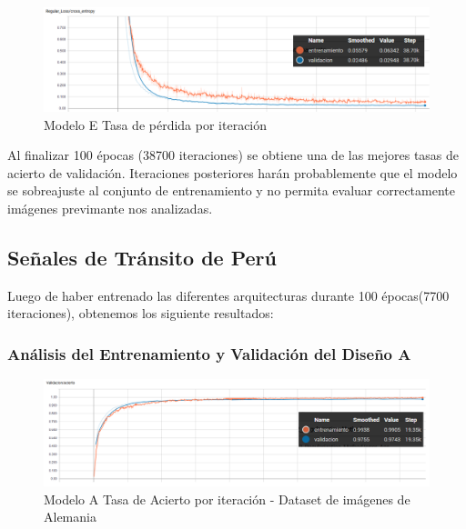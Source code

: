 			\begin{figure}[H]
				\begin{center}
				\includegraphics[width=1\textwidth]{images/desarrollo/trainResults/model7Loss} 
				\end{center}
				\begin{center}
				\caption{\small{Modelo E Tasa de pérdida por iteración}}
				\vspace{-1em}
				{\small{\fontsize{10}{16.8}\selectfont {Fuente propia}}}
				\end{center}
				\vspace{-1.5em}
			\end{figure}
		
			Al finalizar 100 épocas (38700 iteraciones) se obtiene una de las mejores tasas de acierto de validación. Iteraciones posteriores harán probablemente que el modelo se sobreajuste al conjunto de entrenamiento y no permita evaluar correctamente imágenes previmante nos analizadas.


	\subsection{Señales de Tránsito de Perú}
		Luego de haber entrenado las diferentes arquitecturas durante 100 épocas(7700 iteraciones), obtenemos los siguiente resultados:

		\subsubsection{Análisis del Entrenamiento y Validación del Diseño A}  
			\begin{figure}[H]
				\begin{center}
				\includegraphics[width=1\textwidth]{images/desarrollo/trainResults/model0Acierto} 
				\end{center}
				\begin{center}
				\caption{\small{Modelo A Tasa de Acierto por iteración - Dataset de imágenes de Alemania  }}
				\vspace{-1em}
				{\small{\fontsize{10}{16.8}\selectfont {Fuente propia}}}
				\end{center}
				\vspace{-1.5em}
			\end{figure}

